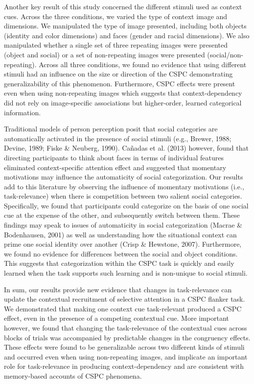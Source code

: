 \documentclass[english,,man,floatsintext]{apa6}
\begin{document}
Another key result of this study concerned the different stimuli used as context cues. Across the three conditions, we varied the type of context image and dimensions. We manipulated the type of image presented, including both objects (identity and color dimensions) and faces (gender and racial dimensions). We also manipulated whether a single set of three repeating images were presented (object and social) or a set of non-repeating images were presented (social/non-repeating). Across all three conditions, we found no evidence that using different stimuli had an influence on the size or direction of the CSPC demonstrating generalizability of this phenomenon. Furthermore, CSPC effects were present even when using non-repeating images which suggests that context-dependency did not rely on image-specific associations but higher-order, learned categorical information.

Traditional models of person perception posit that social categories are automatically activated in the presence of social stimuli (e.g., Brewer, 1988; Devine, 1989; Fiske \& Neuberg, 1990). Cañadas et al. (2013) however, found that directing participants to think about faces in terms of individual features eliminated context-specific attention effect and suggested that momentary motivations may influence the automaticity of social categorization. Our results add to this literature by observing the influence of momentary motivations (i.e., task-relevance) when there is competition between two salient social categories. Specifically, we found that participants could categorize on the basis of one social cue at the expense of the other, and subsequently switch between them. These findings may speak to issues of automaticity in social categorization (Macrae \& Bodenhausen, 2001) as well as understanding how the situational context can prime one social identity over another (Crisp \& Hewstone, 2007). Furthermore, we found no evidence for differences between the social and object conditions. This suggests that categorization within the CSPC task is quickly and easily learned when the task supports such learning and is non-unique to social stimuli.

In sum, our results provide new evidence that changes in task-relevance can update the contextual recruitment of selective attention in a CSPC flanker task. We demonstrated that making one context cue task-relevant produced a CSPC effect, even in the presence of a competing contextual cue. More important however, we found that changing the task-relevance of the contextual cues across blocks of trials was accompanied by predictable changes in the congruency effects. These effects were found to be generalizable across two different kinds of stimuli and occurred even when using non-repeating images, and implicate an important role for task-relevance in producing context-dependency and are consistent with memory-based accounts of CSPC phenomena.
\end{document}
